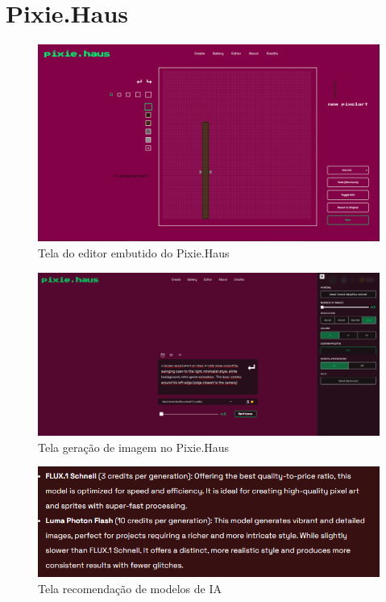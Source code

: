\FloatBarrier
\section{Pixie.Haus}
\label{s.pixieHausApendice}

\begin{figure}[htbp]
    \centering
    \caption{\small Tela do editor embutido do Pixie.Haus}
    \label{fig:pixieHausEditor}
    \includegraphics[width=1\linewidth]{figs/pixieHaus/tela_editor.PNG}
\end{figure}

\begin{figure}[htbp]
    \centering
    \caption{\small Tela geração de imagem no Pixie.Haus}
    \label{fig:pixieHausGeraImagem}
    \includegraphics[width=1\linewidth]{figs/pixieHaus/tela1.PNG}
\end{figure}

\begin{figure}[htbp]
    \centering
    \caption{\small Tela recomendação de modelos de IA}
    \label{fig:pixieHausRecomenda}
    \includegraphics[width=1\linewidth]{figs/pixieHaus/tela_recomendação.PNG}
\end{figure}

